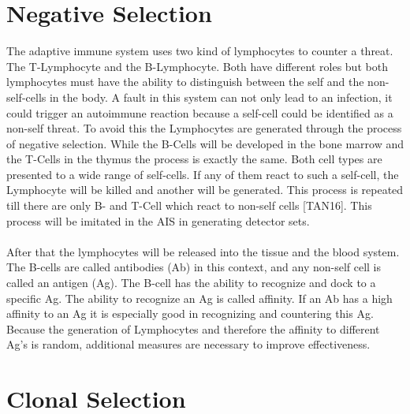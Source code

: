 \section{Negative Selection}

The adaptive immune system uses two kind of lymphocytes to counter a threat. The T-Lymphocyte and the B-Lymphocyte. Both have different roles but both lymphocytes must have the ability to distinguish between the self and the non-self-cells in the body. A fault in this system can not only lead to an infection, it could trigger an autoimmune reaction because a self-cell could be identified as a non-self threat. To avoid this the Lymphocytes are generated through the process of negative selection. While the B-Cells will be developed in the bone marrow and the T-Cells in the thymus the process is exactly the same. Both cell types are presented to a wide range of self-cells. If any of them react to such a self-cell, the Lymphocyte will be killed and another will be generated. This process is repeated till there are only B- and T-Cell which react to non-self cells [TAN16]. This process will be imitated in the AIS in generating detector sets.
\\\\
After that the lymphocytes will be released into the tissue and the blood system. The B-cells are called antibodies (Ab) in this context, and any non-self cell is called an antigen (Ag). The B-cell has the ability to recognize and dock to a specific Ag. The ability to recognize an Ag is called affinity. If an Ab has a high affinity to an Ag it is especially good in recognizing and countering this Ag. Because the generation of Lymphocytes and therefore the affinity to different Ag’s is random, additional measures are necessary to improve effectiveness.

\section{Clonal Selection}

